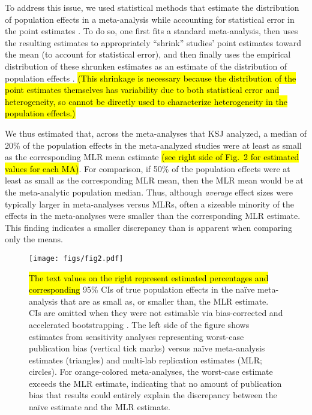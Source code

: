 \documentclass[man,floatsintext]{apa7}
\begin{document}
To address this issue, we used statistical methods that estimate the distribution of population effects in a meta-analysis while accounting for statistical error in the point estimates \parencite{mathur2020robust,mathur2019new}. To do so, one first fits a standard meta-analysis, then uses the resulting estimates to appropriately ``shrink'' studies' point estimates toward the mean (to account for statistical error), and then finally uses the empirical distribution of these shrunken estimates as an estimate of the distribution of population effects \parencite{mathur2020robust,mathur2019new,MetaUtility}. \hl{(This shrinkage is necessary because the distribution of the point estimates themselves has variability due to both statistical error and heterogeneity, so cannot be directly used to characterize heterogeneity in the population effects.)}


We thus estimated that, across the meta-analyses that KSJ analyzed, a median of 20\% of the population effects in the meta-analyzed studies were at least as small as the corresponding MLR mean estimate \hl{(see right side of Fig.\ 2 for estimated values for each MA)}. For comparison, if 50\% of the population effects were at least as small as the corresponding MLR mean, then the MLR mean would be at the meta-analytic population median. Thus, although \emph{average} effect sizes were typically larger in meta-analyses versus MLRs, often a sizeable minority of the effects in the meta-analyses were smaller than the corresponding MLR estimate. This finding indicates a smaller discrepancy than is apparent when comparing only the means. 

\begin{figure}[ht]
\centering
     \texttt{[image: figs/fig2.pdf]}
      \caption{ \hl{The text values on the right represent estimated percentages and corresponding }95\% CIs of true population effects in the naïve meta-analysis that are as small as, or smaller than, the MLR estimate. CIs are omitted when they were not estimable via bias-corrected and accelerated bootstrapping \parencite{mathur2020robust}. The left side of the figure shows estimates from sensitivity analyses representing worst-case publication bias (vertical tick marks) versus na\"ive meta-analysis estimates (triangles) and multi-lab replication estimates (MLR; circles). For orange-colored meta-analyses, the worst-case estimate exceeds the MLR estimate, indicating that no amount of publication bias that results could entirely explain the discrepancy between the naïve estimate and the MLR estimate. }
\end{figure}
\end{document}
